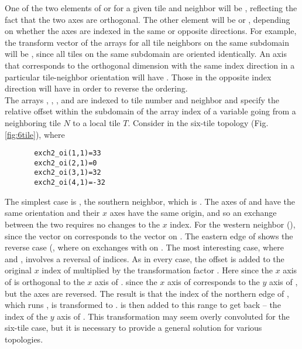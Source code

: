 One of the two elements of  or  for a
given tile  and neighbor  will be , reflecting
the fact that the two axes are orthogonal.  The other element will be
 or , depending on whether the axes are indexed in
the same or opposite directions.  For example, the transform vector of
the arrays for all tile neighbors on the same subdomain will be
, since all tiles on the same subdomain are oriented
identically.  An axis that corresponds to the orthogonal dimension
with the same index direction in a particular tile-neighbor
orientation will have .  Those in the opposite index
direction will have  in order to reverse the ordering. \\

The arrays ,
, , and
 are indexed to tile number and
neighbor and specify the relative offset within the subdomain of the
array index of a variable going from a neighboring tile $N$ to a local
tile $T$.  Consider  in the six-tile topology
(Fig. \ref{fig:6tile}), where

\begin{verbatim}
       exch2_oi(1,1)=33
       exch2_oi(2,1)=0
       exch2_oi(3,1)=32
       exch2_oi(4,1)=-32
\end{verbatim}

The simplest case is , the southern neighbor,
which is .  The axes of  and  have the
same orientation and their $x$ axes have the same origin, and so an
exchange between the two requires no changes to the $x$ index.  For
the western neighbor (),  since the
 vector on  corresponds to the  vector on
.  The eastern edge of  shows the reverse case
(, where  on  exchanges
with  on .  The most interesting case, where
 and , involves a reversal of
indices.  As in every case, the offset  is added to
the original $x$ index of  multiplied by the transformation
factor .  Here  since
the $x$ axis of  is orthogonal to the $x$ axis of .
 since the $x$ axis of  corresponds
to the $y$ axis of , but the axes are reversed.  The result
is that the index of the northern edge of , which runs
, is transformed to
.  is then added to this range to
get back  -- the index of the $y$ axis of .
This transformation may seem overly convoluted for the six-tile case,
but it is necessary to provide a general solution for various
topologies. \\



